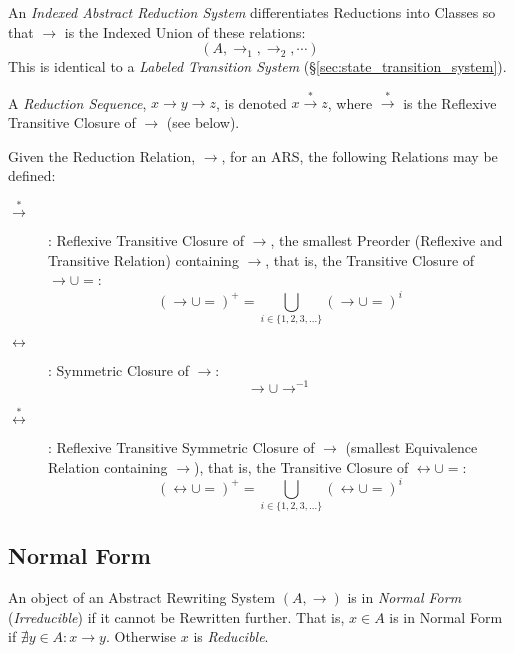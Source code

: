 An \emph{Indexed Abstract Reduction System} differentiates Reductions
into Classes so that $\rightarrow$ is the Indexed Union of these
relations:
    \[(A, \rightarrow_1, \rightarrow_2, \cdots)\]
This is identical to a \emph{Labeled Transition System}
(\S\ref{sec:state_transition_system}).

A \emph{Reduction Sequence}, $x \rightarrow y \rightarrow z$, is
denoted $x \stackrel{*}\rightarrow z$, where $\stackrel{*}\rightarrow$
is the Reflexive Transitive Closure of $\rightarrow$ (see below).

Given the Reduction Relation, $\rightarrow$, for an ARS, the following
Relations may be defined:

\begin{description}

\item [$\stackrel{*}\rightarrow$]: Reflexive Transitive Closure of
  $\rightarrow$, the smallest Preorder (Reflexive and Transitive
  Relation) containing $\rightarrow$, that is, the Transitive Closure
  of $\rightarrow \cup =$:
  \[ (\rightarrow \cup =)^+ =
    \bigcup_{i \in \{1,2,3,...\}} (\rightarrow \cup =)^i \]

\item [$\leftrightarrow$]: Symmetric Closure of $\rightarrow$:
  \[ \rightarrow \cup \rightarrow^{-1} \]

\item [$\stackrel{*}\leftrightarrow$]: Reflexive Transitive
  Symmetric Closure of $\rightarrow$ (smallest Equivalence Relation
  containing $\rightarrow$), that is, the Transitive Closure of
  $\leftrightarrow \cup =$:
  \[ (\leftrightarrow \cup =)^+ =
    \bigcup_{i \in \{1,2,3,...\}} (\leftrightarrow \cup =)^i \]

\end{description}



\subsection{Normal Form}\label{sec:normal_form}

An object of an Abstract Rewriting System $(A,\rightarrow)$ is in
\emph{Normal Form} (\emph{Irreducible}) if it cannot be Rewritten
further. That is, $x \in A$ is in Normal Form if $\nexists y \in A : x
\rightarrow y$. Otherwise $x$ is \emph{Reducible}.

